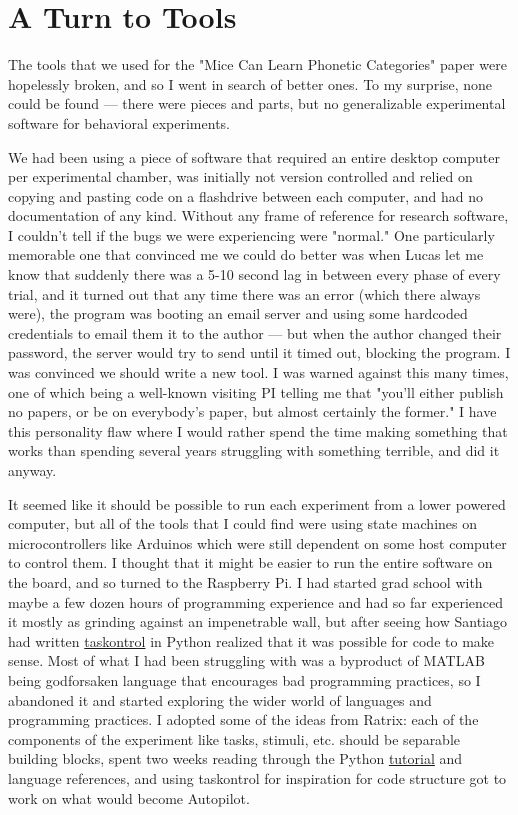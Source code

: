 \chapter*{A Turn to Tools}

The tools that we used for the "Mice Can Learn Phonetic Categories" paper were hopelessly broken, and so I went in search of better ones. To my surprise, none could be found --- there were pieces and parts, but no generalizable experimental software for behavioral experiments. 

We had been using a piece of software that required an entire desktop computer per experimental chamber, was initially not version controlled and relied on copying and pasting code on a flashdrive between each computer, and had no documentation of any kind. Without any frame of reference for research software, I couldn't tell if the bugs we were experiencing were "normal." One particularly memorable one that convinced me we could do better was when Lucas let me know that suddenly there was a 5-10 second lag in between every phase of every trial, and it turned out that any time there was an error (which there always were), the program was booting an email server and using some hardcoded credentials to email them it to the author --- but when the author changed their password, the server would try to send until it timed out, blocking the program. I was convinced we should write a new tool. I was warned against this many times, one of which being a well-known visiting PI telling me that "you'll either publish no papers, or be on everybody's paper, but almost certainly the former." I have this personality flaw where I would rather spend the time making something that works than spending several years struggling with something terrible, and did it anyway.

It seemed like it should be possible to run each experiment from a lower powered computer, but all of the tools that I could find were using state machines on microcontrollers like Arduinos which were still dependent on some host computer to control them. I thought that it might be easier to run the entire software on the board, and so turned to the Raspberry Pi. I had started grad school with maybe a few dozen hours of programming experience and had so far experienced it mostly as grinding against an impenetrable wall, but after seeing how Santiago had written \href{https://github.com/sjara/taskontrol}{taskontrol} in Python realized that it was possible for code to make sense. Most of what I had been struggling with was a byproduct of MATLAB being godforsaken language that encourages bad programming practices, so I abandoned it and started exploring the wider world of languages and programming practices. I adopted some of the ideas from Ratrix: each of the components of the experiment like tasks, stimuli, etc. should be separable building blocks, spent two weeks reading through the Python \href{https://docs.python.org/3/tutorial/index.html}{tutorial} and language references, and using taskontrol for inspiration for code structure got to work on what would become Autopilot.


